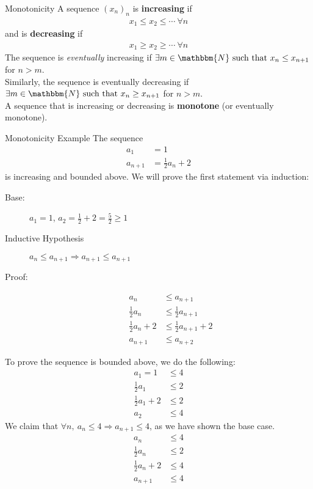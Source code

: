 \documentclass[10pt]{extarticle}
\newcommand{\N}{\mathbbm{N}}
\begin{document}
  \begin{problem}{Monotonicity}
    A sequence $(x_n)_n$ is \textbf{increasing} if
    \begin{align*}
      x_1 \leq x_2 \leq \cdots~\forall n
    \end{align*}
    and is \textbf{decreasing} if
    \begin{align*}
      x_1 \geq x_2 \geq \cdots~\forall n
    \end{align*}
    The sequence is \textsl{eventually} increasing if $\exists m\in \N \text{ such that } x_n \leq x_{n+1}$ for $n > m$.\\

    Similarly, the sequence is eventually decreasing if $\exists m\in\N \text{ such that } x_n \geq x_{n+1}$ for $n > m$.\\

    A sequence that is increasing or decreasing is \textbf{monotone} (or eventually monotone).\\

  \end{problem}
  \begin{problem}{Monotonicity Example}
    The sequence
    \begin{align*}
      a_1 &= 1\\
      a_{n+1} &= \frac{1}{2}a_n + 2
    \end{align*}
    is increasing and bounded above.
    \tcblower
    We will prove the first statement via induction:
    \begin{description}
      \item[Base:] $a_1 = 1$, $a_2 = \frac{1}{2} + 2 = \frac{5}{2} \geq 1$
      \item[Inductive Hypothesis] $a_n \leq a_{n+1} \Rightarrow a_{n+1} \leq a_{n+1}$
      \item[Proof:]
        \begin{align*}
          a_{n} &\leq a_{n+1}\\
          \frac{1}{2}a_n &\leq \frac{1}{2}a_{n+1}\\
          \frac{1}{2}a_n + 2 &\leq \frac{1}{2}a_{n+1} + 2\\
          a_{n+1} &\leq a_{n+2}
        \end{align*}
    \end{description}
    To prove the sequence is bounded above, we do the following:
    \begin{align*}
      a_1 = 1 &\leq 4\\
      \frac{1}{2}a_1 &\leq 2\\
      \frac{1}{2}a_1 + 2 &\leq 2\\
      a_{2} &\leq 4
    \end{align*}
    We claim that $\forall n,~a_n \leq 4 \Rightarrow a_{n+1} \leq 4$, as we have shown the base case.
    \begin{align*}
      a_{n} &\leq 4\\
      \frac{1}{2}a_n &\leq 2\\
      \frac{1}{2}a_n + 2 &\leq 4\\
      a_{n+1} &\leq 4
    \end{align*}
  \end{problem}
\end{document}
